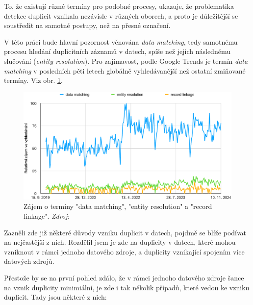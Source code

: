 To, že existují různé termíny pro podobné procesy, ukazuje, že problematika detekce duplicit vznikala nezávisle v různých oborech, a proto je důležitější se soustředit na samotné postupy, než na přesné označení. \cite{christen_data_2012}

V této práci bude hlavní pozornost věnována \textit{data matching}, tedy samotnému procesu hledání duplicitních záznamů v datech, spíše než jejich následnému slučování (\textit{entity resolution}). Pro zajímavost, podle Google Trends je termín \textit{data matching} v posledních pěti letech globálně vyhledávanější než ostatní zmiňované termíny. Viz obr. \ref{fig:google-trends}.


\begin{figure}[htb]
  \centering
  \includegraphics[scale=0.6]{images/google-trends.pdf}
  \caption{Zájem o termíny "data matching", "entity resolution" a "record linkage".\newline
    \textit{Zdroj}: \cite{google_trends_google_2024}}
  \label{fig:google-trends}
\end{figure}
\pagebreak

Zazněli zde již některé důvody vzniku duplicit v datech, pojdmě se blíže podívat na nejčastější z nich. Rozdělil jsem je zde na duplicity v datech, které mohou vzniknout v rámci jednoho datového zdroje, a duplicity vznikající spojením více datových zdrojů.

Přestože by se na první pohled zdálo, že v rámci jednoho datového zdroje šance na vznik duplicity minimiální, je zde i tak několik případů, které vedou ke vzniku duplicit. Tady jsou některé z nich:

